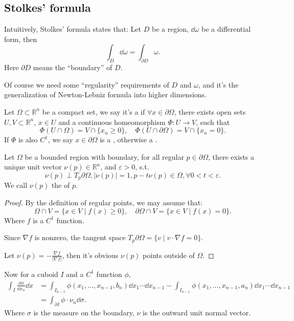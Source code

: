 \subsection{Stolkes' formula}
\label{sub:Stolkes' formula}
Intuitively, Stolkes' formula states that:
Let $D$ be a region, $\dd \omega$ be a differential form,
then
\[
\int_D \dd \omega = \int_{\partial D} \omega.
\]
Here $\partial D$ means the ``boundary'' of $D$.

Of course we need some ``regularity'' requirements of $D$ and $\omega$,
and it's the generalization of Newton-Lebniz formula into higher dimensions.

\begin{definition}
	Let $\Omega \subset \mathbb{R}^{n}$ be a compact set,
	we say it's a  if
	$\forall x\in \partial \Omega$,
	there exists open sets $U, V \subset \mathbb{R}^n$,
	$x\in U$ and a continuous homeomorphism $\Phi: U\to V$,
	such that
	\[
	\Phi(U\cap \Omega) = V\cap \{x_n\ge 0\}, \quad
	\Phi(U\cap \partial\Omega) = V\cap \{x_n = 0\}.
	\]
	If $\Phi$ is also $C^1$, we say $x\in \partial\Omega$ is a ,
	otherwise a .
\end{definition}

\begin{lemma}
	Let $\Omega$ be a bounded region with boundary,
	for all regular $p\in \partial\Omega$, there exists a unique unit vector
	$\nu(p) \in \mathbb{R}^{n}$, and $\varepsilon > 0$, s.t.
	\[
	\nu(p) \perp T_p\partial\Omega, |\nu(p)| = 1,
	p - t\nu(p) \in \Omega, \forall 0<t<\varepsilon.
	\]
	We call $\nu(p)$ the  of $p$.
\end{lemma}
\begin{proof}[Proof]
    By the definition of regular points, we may assume that:
	\[
	\Omega\cap V = \{x\in V\mid f(x)\ge 0\}, \quad
	\partial\Omega \cap V = \{x\in V\mid f(x) = 0\}.
	\]
	Where $f$ is a $C^1$ function.

	Since $\nabla f$ is nonzero,
	the tangent space $T_p\partial\Omega = \{v\mid v\cdot \nabla f = 0\}$.

	Let $\nu(p) = - \frac{\nabla f}{|\nabla f|}$, then it's obvious $\nu(p)$ points
	outside of $\Omega$.
\end{proof}

Now for a cuboid $I$ and a $C^1$ function $\phi$,
 \begin{align*}
\int_I \frac{\dd \phi}{\dd x_n} \dd x
&= \int_{I_{n-1}} \phi(x_1, \dots, x_{n-1}, b_n)\dd x_1\cdots \dd x_{n-1}
- \int_{I_{n-1}} \phi(x_1, \dots, x_{n-1}, a_n)\dd x_1\cdots \dd x_{n-1}\\
&= \int_{\partial I} \phi \cdot \nu_n \dd \sigma.
\end{align*}
Where $\sigma$ is the measure on the boundary, $\nu$ is the outward unit
normal vector.

